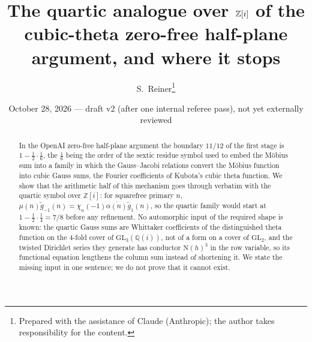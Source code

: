 \documentclass[11pt]{article}
\title{The quartic analogue over $\Z[i]$ of the cubic-theta zero-free half-plane argument, and where it stops}
\author{S.~Reiner\thanks{Prepared with the assistance of Claude (Anthropic); the author takes responsibility for the content.}}
\date{October 28, 2026 --- draft v2 (after one internal referee pass), not yet externally reviewed}
\newcommand{\N}{\mathrm N}
\newcommand{\Z}{\mathbb Z}
\newcommand{\Q}{\mathbb Q}
\begin{document}
\maketitle

\begin{abstract}
In the OpenAI zero-free half-plane argument the boundary $11/12$ of the first stage is $1-\tfrac12\cdot\tfrac16$, the $\tfrac16$ being the order of the sextic residue symbol used to embed the M\"obius sum into a family in which the Gauss--Jacobi relations convert the M\"obius function into cubic Gauss sums, the Fourier coefficients of Kubota's cubic theta function. We show that the arithmetic half of this mechanism goes through verbatim with the quartic symbol over $\Z[i]$: for squarefree primary $n$, $\mu(n)\tilde g_{-1}(n)=\chi_n(-1)\overline{\alpha(n)}\tilde g_1(n)$, so the quartic family would start at $1-\tfrac12\cdot\tfrac14=7/8$ before any refinement. No automorphic input of the required shape is known: the quartic Gauss sums are Whittaker coefficients of the distinguished theta function on the $4$-fold cover of $\mathrm{GL}_3(\Q(i))$, not of a form on a cover of $\mathrm{GL}_2$, and the twisted Dirichlet series they generate has conductor $\N(h)^3$ in the row variable, so its functional equation lengthens the column sum instead of shortening it. We state the missing input in one sentence; we do not prove that it cannot exist.
\end{abstract}
\end{document}
